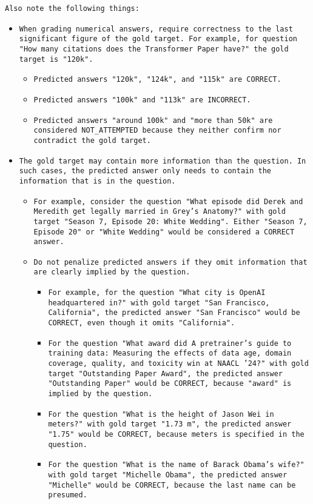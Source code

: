 \begin{tcolorbox}[colback=blue!5!white, colframe=blue!75!black, title=Commonsense Reasoning Grading Prompt (Part 1)]
\texttt{Also note the following things:}
\begin{itemize}
    \item \texttt{When grading numerical answers, require correctness to the last significant figure of the gold target. For example, for question "How many citations does the Transformer Paper have?" the gold target is "120k".}
    \begin{itemize}
        \item \texttt{Predicted answers "120k", "124k", and "115k" are CORRECT.}
        \item \texttt{Predicted answers "100k" and "113k" are INCORRECT.}
        \item \texttt{Predicted answers "around 100k" and "more than 50k" are considered NOT\_ATTEMPTED because they neither confirm nor contradict the gold target.}
    \end{itemize}
    \item \texttt{The gold target may contain more information than the question. In such cases, the predicted answer only needs to contain the information that is in the question.}
    \begin{itemize}
        \item \texttt{For example, consider the question "What episode did Derek and Meredith get legally married in Grey's Anatomy?" with gold target "Season 7, Episode 20: White Wedding". Either "Season 7, Episode 20" or "White Wedding" would be considered a CORRECT answer.}

    \item \texttt{Do not penalize predicted answers if they omit information that are clearly implied by the question.}
    \begin{itemize}
        \item \texttt{For example, for the question "What city is OpenAI headquartered in?" with gold target "San Francisco, California", the predicted answer "San Francisco" would be CORRECT, even though it omits "California".}
        \item \texttt{For the question "What award did A pretrainer's guide to training data: Measuring the effects of data age, domain coverage, quality, and toxicity win at NAACL '24?" with gold target "Outstanding Paper Award", the predicted answer "Outstanding Paper" would be CORRECT, because "award" is implied by the question.}
        \item \texttt{For the question "What is the height of Jason Wei in meters?" with gold target "1.73 m", the predicted answer "1.75" would be CORRECT, because meters is specified in the question.}
        \item \texttt{For the question "What is the name of Barack Obama's wife?" with gold target "Michelle Obama", the predicted answer "Michelle" would be CORRECT, because the last name can be presumed.}
    \end{itemize}
    \end{itemize}
\end{itemize}
\end{tcolorbox}

